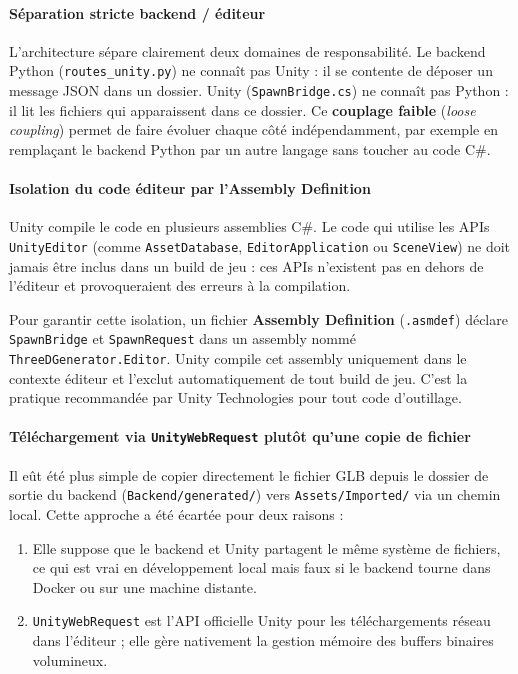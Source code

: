 \documentclass[12pt,a4paper,oneside]{report}
\begin{document}
\paragraph{Séparation stricte backend / éditeur}

L'architecture sépare clairement deux domaines de responsabilité.
Le backend Python (\texttt{routes\_unity.py}) ne connaît pas Unity :
il se contente de déposer un message JSON dans un dossier. Unity
(\texttt{SpawnBridge.cs}) ne connaît pas Python : il lit les fichiers
qui apparaissent dans ce dossier. Ce \textbf{couplage faible}
(\textit{loose coupling}) permet de faire évoluer chaque côté
indépendamment, par exemple en remplaçant le backend Python par
un autre langage sans toucher au code C\#.

\paragraph{Isolation du code éditeur par l'Assembly Definition}

Unity compile le code en plusieurs assemblies C\#. Le code qui utilise
les APIs \texttt{UnityEditor} (comme \texttt{AssetDatabase},
\texttt{EditorApplication} ou \texttt{SceneView}) ne doit jamais
être inclus dans un build de jeu : ces APIs n'existent pas en dehors
de l'éditeur et provoqueraient des erreurs à la compilation.

Pour garantir cette isolation, un fichier
\textbf{Assembly Definition} (\texttt{.asmdef}) déclare
\texttt{SpawnBridge} et \texttt{SpawnRequest} dans un assembly
nommé \texttt{ThreeDGenerator.Editor}. Unity compile cet assembly
uniquement dans le contexte éditeur et l'exclut automatiquement
de tout build de jeu. C'est la pratique recommandée par Unity
Technologies pour tout code d'outillage.

\paragraph{Téléchargement via \texttt{UnityWebRequest} plutôt qu'une copie de fichier}

Il eût été plus simple de copier directement le fichier GLB depuis
le dossier de sortie du backend (\texttt{Backend/generated/}) vers
\texttt{Assets/Imported/} via un chemin local. Cette approche a été
écartée pour deux raisons :

\begin{enumerate}
  \item Elle suppose que le backend et Unity partagent le même système
    de fichiers, ce qui est vrai en développement local mais faux si
    le backend tourne dans Docker ou sur une machine distante.
  \item \texttt{UnityWebRequest} est l'API officielle Unity pour les
    téléchargements réseau dans l'éditeur ; elle gère nativement la
    gestion mémoire des buffers binaires volumineux.
\end{enumerate}
\end{document}

